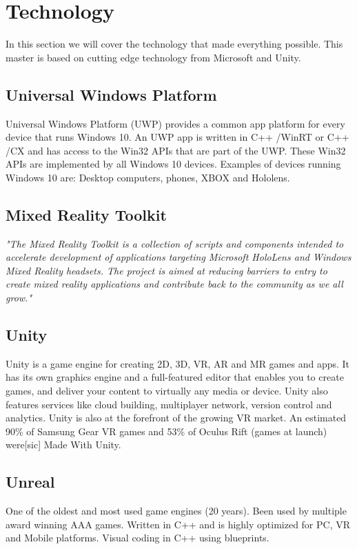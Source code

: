     \section{Technology}
        In this section we will cover the technology that made everything possible. This master is based on cutting edge technology from Microsoft and Unity.
    
        \subsection{Universal Windows Platform}
            Universal Windows Platform (UWP) provides a common app platform for every device that runs Windows 10. An UWP app is written in C++ /WinRT or C++ /CX and has access to the Win32 APIs that are part of the UWP. These Win32 APIs are implemented by all Windows 10 devices.\cite{wdc-UWP} Examples of devices running Windows 10 are: Desktop computers, phones, XBOX and Hololens.
        
        \subsection{Mixed Reality Toolkit}
            \emph{"The Mixed Reality Toolkit is a collection of scripts and components intended to accelerate development of applications targeting Microsoft HoloLens and Windows Mixed Reality headsets. The project is aimed at reducing barriers to entry to create mixed reality applications and contribute back to the community as we all grow."}\cite{MRToolkitReadme}
    
        \subsection{Unity}
            Unity is a game engine for creating 2D, 3D, VR, AR and MR games and apps. It has its own graphics engine and a full-featured editor that enables you to create games, and deliver your content to virtually any media or device. Unity also features services like cloud building, multiplayer network, version control and analytics. Unity is also at the forefront of the growing VR market. An estimated 90\% of Samsung Gear VR games and 53\% of Oculus Rift (games at launch) were[sic] Made With Unity. \cite{UnityAbout}
        
        \subsection{Unreal}
            One of the oldest and most used game engines (20 years). Been used by multiple award winning AAA games. Written in C++ and is highly optimized for PC, VR and Mobile platforms.
            Visual coding in C++ using blueprints.
    
